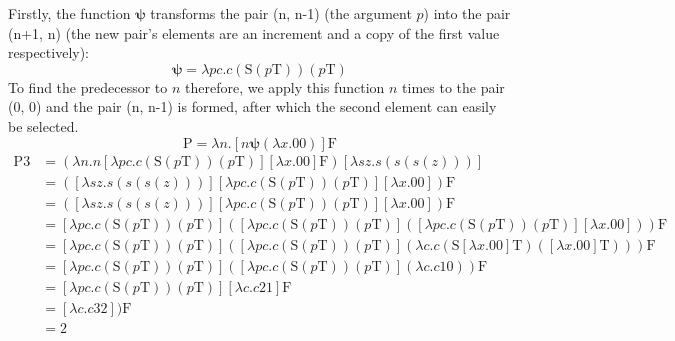 \documentclass[Master.tex]{subfiles}
\begin{document}
Firstly, the function $\bm{\psi}$ transforms the pair (n, n-1) (the argument $p$) into the pair (n+1, n) (the new pair's elements are an increment and a copy of the first value respectively):
\begin{equation*}
\bm{\psi} = \lambda pc.c(\bm{\mathrm{S}}(p\bm{\mathrm{T}}))(p\bm{\mathrm{T}})
\end{equation*}
To find the predecessor to $n$ therefore, we apply this function $n$ times to the pair (0, 0) and the pair (n, n-1) is formed, after which the second element can easily be selected.
\begin{equation*}
\bm{\mathrm{P}} = \lambda n.[n \bm{\psi} (\lambda x.\bm{\mathrm{00}})] \bm{\mathrm{F}} 
\end{equation*}
\begin{equation*}
\begin{aligned}
\bm{\mathrm{P3}} &= (\lambda n.n [\lambda pc.c(\bm{\mathrm{S}}(p\bm{\mathrm{T}}))(p\bm{\mathrm{T}})] [\lambda x.\bm{\mathrm{00}}] \bm{\mathrm{F}}) [\lambda sz.s(s(s(z)))]\\
&= ([\lambda sz.s(s(s(z)))] [\lambda pc.c(\bm{\mathrm{S}}(p\bm{\mathrm{T}}))(p\bm{\mathrm{T}})] [\lambda x.\bm{\mathrm{00}}]) \bm{\mathrm{F}}\\
&= ([\lambda sz.s(s(s(z)))] [\lambda pc.c(\bm{\mathrm{S}}(p\bm{\mathrm{T}}))(p\bm{\mathrm{T}})] [\lambda x.\bm{\mathrm{00}}]) \bm{\mathrm{F}}\\
&= [\lambda pc.c(\bm{\mathrm{S}}(p\bm{\mathrm{T}}))(p\bm{\mathrm{T}})]([\lambda pc.c(\bm{\mathrm{S}}(p\bm{\mathrm{T}}))(p\bm{\mathrm{T}})]([\lambda pc.c(\bm{\mathrm{S}}(p\bm{\mathrm{T}}))(p\bm{\mathrm{T}})][\lambda x.\bm{\mathrm{00}}]))\bm{\mathrm{F}}\\
&= [\lambda pc.c(\bm{\mathrm{S}}(p\bm{\mathrm{T}}))(p\bm{\mathrm{T}})]([\lambda pc.c(\bm{\mathrm{S}}(p\bm{\mathrm{T}}))(p\bm{\mathrm{T}})](\lambda c.c(\bm{\mathrm{S}}[\lambda x.\bm{\mathrm{00}}]\bm{\mathrm{T}})([\lambda x.\bm{\mathrm{00}}]\bm{\mathrm{T}})))\bm{\mathrm{F}}\\
&= [\lambda pc.c(\bm{\mathrm{S}}(p\bm{\mathrm{T}}))(p\bm{\mathrm{T}})]([\lambda pc.c(\bm{\mathrm{S}}(p\bm{\mathrm{T}}))(p\bm{\mathrm{T}})](\lambda c.c\bm{\mathrm{10}}))\bm{\mathrm{F}}\\
&= [\lambda pc.c(\bm{\mathrm{S}}(p\bm{\mathrm{T}}))(p\bm{\mathrm{T}})][\lambda c.c\bm{\mathrm{21}}]\bm{\mathrm{F}}\\
&= [\lambda c.c\bm{\mathrm{32}} ])\bm{\mathrm{F}}\\
&= \bm{\mathrm{2}}
\end{aligned}
\end{equation*}
\end{document}
